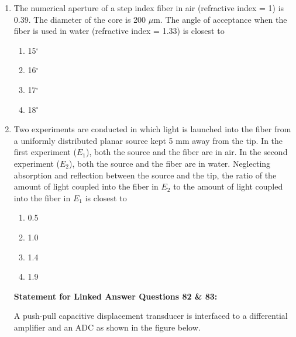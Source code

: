 \documentclass[journal]{IEEEtran}
\begin{document}
\begin{enumerate}
\begin{multicols}{2}
\begin{enumerate}
\item 011  
\item 010  
\item 100  
\item 101  
\end{enumerate}
\end{multicols}



\item 
The numerical aperture of a step index fiber in air (refractive index = 1) is 0.39. The diameter of the core is 200 $\mu$m. The angle of acceptance when the fiber is used in water (refractive index = 1.33) is closest to  

\begin{multicols}{2}
\begin{enumerate}
\item 15$^\circ$  
\item 16$^\circ$  
\item 17$^\circ$  
\item 18$^\circ$  
\end{enumerate}
\end{multicols}


\item 
Two experiments are conducted in which light is launched into the fiber from a uniformly distributed planar source kept 5 mm away from the tip. In the first experiment ($E_1$), both the source and the fiber are in air. In the second experiment ($E_2$), both the source and the fiber are in water. Neglecting absorption and reflection between the source and the tip, the ratio of the amount of light coupled into the fiber in $E_2$ to the amount of light coupled into the fiber in $E_1$ is closest to  

\begin{multicols}{2}
\begin{enumerate}
\item 0.5  
\item 1.0  
\item 1.4  
\item 1.9  
\end{enumerate}
\end{multicols}


\textbf{Statement for Linked Answer Questions 82 \& 83:}  

A push-pull capacitive displacement transducer is interfaced to a differential amplifier and an ADC as shown in the figure below.  


\end{enumerate}
\end{document}
